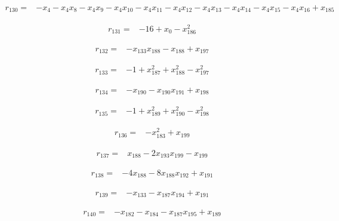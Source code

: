 \documentclass[10pt,letterpaper]{article}
\theoremstyle{remark}\newtheorem{remark}[theorem]{Remark}
\begin{document}
\begin{align*}
r_{130}={}&-x_{4}-x_{4}x_{8}-x_{4}x_{9}-x_{4}x_{10}-x_{4}x_{11}-x_{4}x_{12}-x_{4}x_{13}-x_{4}x_{14}-x_{4}x_{15}-x_{4}x_{16}+x_{185}
\end{align*}

\begin{align*}
r_{131}={}&-16+x_{0}-x_{186}^{2}
\end{align*}

\begin{align*}
r_{132}={}&-x_{133}x_{188}-x_{188}+x_{197}
\end{align*}

\begin{align*}
r_{133}={}&-1+x_{187}^{2}+x_{188}^{2}-x_{197}^{2}
\end{align*}

\begin{align*}
r_{134}={}&-x_{190}-x_{190}x_{191}+x_{198}
\end{align*}

\begin{align*}
r_{135}={}&-1+x_{189}^{2}+x_{190}^{2}-x_{198}^{2}
\end{align*}

\begin{align*}
r_{136}={}&-x_{183}^{2}+x_{199}
\end{align*}

\begin{align*}
r_{137}={}&x_{188}-2x_{193}x_{199}-x_{199}
\end{align*}

\begin{align*}
r_{138}={}&-4x_{188}-8x_{188}x_{192}+x_{191}
\end{align*}

\begin{align*}
r_{139}={}&-x_{133}-x_{187}x_{194}+x_{191}
\end{align*}

\begin{align*}
r_{140}={}&-x_{182}-x_{184}-x_{187}x_{195}+x_{189}
\end{align*}
\end{document}

